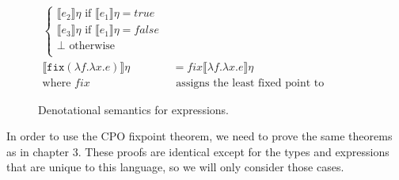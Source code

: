 \begin{figure}
\begin{align*}
 \begin{cases} 
      \llbracket e_2 \rrbracket\eta \text{ if } \llbracket e_1 \rrbracket\eta = true \\
      \llbracket e_3 \rrbracket\eta \text{ if } \llbracket e_1 \rrbracket\eta = false \\
      \perp \text{      otherwise} \\
   \end{cases}
  \\
    \llbracket  \texttt{fix} (\lambda f.\lambda x.e) \rrbracket\eta &= fix\llbracket \lambda f.\lambda x.e \rrbracket\eta \\
 \text{where } fix &\text{ assigns the least fixed point to continuous functions} 
 \end{align*}
 \caption{Denotational semantics for expressions.}
 \end{figure}
 
 In order to use the CPO fixpoint theorem, we need to prove the same theorems as in chapter 3. These proofs are 
 identical except for the types and expressions that are unique to this language, so we will only consider those cases.
 
